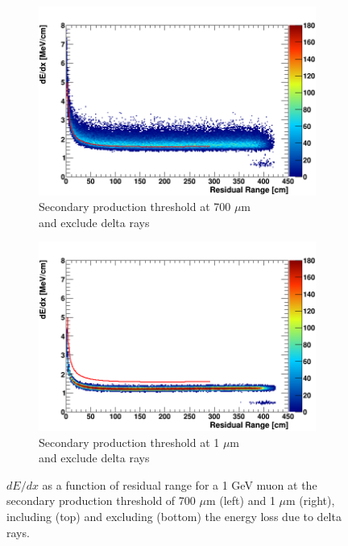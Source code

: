 \begin{figure}[t!]
        \begin{subfigure}[b]{0.495\textwidth}   
            \centering 
            \includegraphics[width=\textwidth]{derr_mu_only_700um}
            \caption{Secondary production threshold at 700 $\mu$m \\ and exclude delta rays}%
            \label{fig:derr_mu_only_700}
        \end{subfigure}
        \hfill
        \begin{subfigure}[b]{0.495\textwidth}   
            \centering 
            \includegraphics[width=\textwidth]{derr_mu_only_1um}
            \caption{Secondary production threshold at 1 $\mu$m \\ and exclude delta rays}%
            \label{fig:derr_mu_only_1}
        \end{subfigure}
        \caption[Energy-Residual Range Scale of Muons at Different Delta Ray Thresholds]{
	$dE/dx$ as a function of residual range for a 1 GeV muon at the secondary production threshold of 700 $\mu$m (left) and 1 $\mu$m (right), including (top) and excluding (bottom) the energy loss due to delta rays. 
	}
        \label{fig:mu_derr}
\end{figure}

